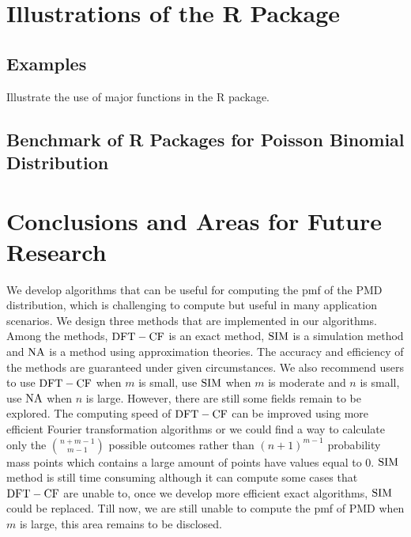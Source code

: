 \documentclass[12pt]{article}
\newcommand{\PMD}{\textrm{PMD}}
\newcommand{\SIM}{{\rm SIM}}
\newcommand{\NA}{{\rm NA}}
\newcommand{\dft}{{\rm DFT-CF}}
\begin{document}
\section{Illustrations of the R Package}
\subsection{Examples}
Illustrate the use of major functions in the R package.


\subsection{Benchmark of R Packages for Poisson Binomial Distribution}



\section{Conclusions and Areas for Future Research}

We develop algorithms that can be useful for computing the pmf of the PMD distribution, which is challenging to compute but useful in many application scenarios. We design three methods that are implemented in our algorithms. Among the methods, $\dft$ is an exact method, $\SIM$ is a simulation method and $\NA$ is a method using approximation theories. The accuracy and efficiency of the methods are guaranteed under given circumstances. We also recommend users to use $\dft$ when $m$ is small, use $\SIM$ when $m$ is moderate and $n$ is small, use $\NA$ when $n$ is large. However, there are still some fields remain to be explored. The computing speed of $\dft$ can be improved using more efficient Fourier transformation algorithms or we could find a way to calculate only the $\binom{n+m-1}{m-1}$ possible outcomes rather than $(n+1)^{m-1}$ probability mass points which contains a large amount of points have values equal to 0. $\SIM$ method is still time consuming although it can compute some cases that $\dft$ are unable to, once we develop more efficient exact algorithms, $\SIM$ could be replaced. Till now, we are still unable to compute the pmf of $\PMD$ when $m$ is large, this area remains to be disclosed.
\end{document}
